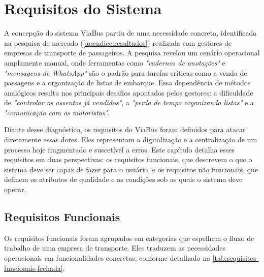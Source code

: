 \chapter{Requisitos do Sistema}\label{cha:requisitos}

A concepção do sistema ViaBus partiu de uma necessidade concreta, identificada na pesquisa de mercado (\autoref{apendice:resultados}) realizada com gestores de empresas de transporte de passageiros. A pesquisa revelou um cenário operacional amplamente manual, onde ferramentas como \textit{"cadernos de anotações"} e \textit{"mensagens de WhatsApp"} são o padrão para tarefas críticas como a venda de passagens e a organização de listas de embarque. Essa dependência de métodos analógicos resulta nos principais desafios apontados pelos gestores: a dificuldade de \textit{"controlar os assentos já vendidos"}, a \textit{"perda de tempo organizando listas"} e a \textit{"comunicação com os motoristas"}.

Diante desse diagnóstico, os requisitos do ViaBus foram definidos para atacar diretamente essas dores. Eles representam a digitalização e a centralização de um processo hoje fragmentado e suscetível a erros. Este capítulo detalha esses requisitos em duas perspectivas: os requisitos funcionais, que descrevem o que o sistema deve ser capaz de fazer para o usuário, e os requisitos não funcionais, que definem os atributos de qualidade e as condições sob as quais o sistema deve operar.

\section{Requisitos Funcionais}

Os requisitos funcionais foram agrupados em categorias que espelham o fluxo de trabalho de uma empresa de transporte. Eles traduzem as necessidades operacionais em funcionalidades concretas, conforme detalhado na \autoref{tab:requisitos-funcionais-fechada}.

